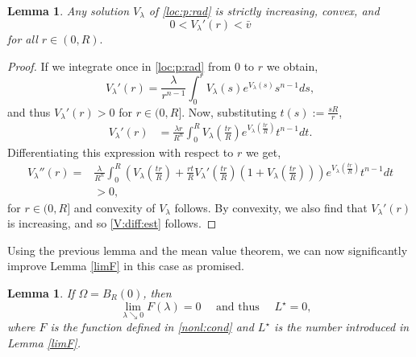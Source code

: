 \documentclass[12pt,a4paper]{amsart}
\newtheorem{lemma}[theorem]{Lemma}
\theoremstyle{definition}
\theoremstyle{remark}
\numberwithin{equation}{section}
\numberwithin{theorem}{section}
\begin{document}
\begin{lemma}
Any solution $V_\lambda$ of \eqref{loc:p:rad} is strictly increasing, convex, and
\begin{equation}\label{V:diff:est}
0<V_\lambda'(r)< \bar{v}
\end{equation}
for all $r\in(0,R).$
\end{lemma}

\begin{proof}
If we integrate once in \eqref{loc:p:rad} from $0$ to $r$ we obtain,
$$
V_\lambda'(r)=\frac{\lambda}{r^{n-1}}\int_0^rV_\lambda(s)e^{V_\lambda(s)}s^{n-1}ds,
$$
and thus $V_\lambda'(r)> 0$ for $r\in(0,R]$. Now,  substituting $t(s):=\frac{sR}{r}$,
\begin{align*}
V_\lambda'(r)
&=\frac{\lambda r}{R^n}
\int_0^R V_\lambda \left(\frac{tr}{R}\right) e^{V_\lambda(\frac{tr}{R})} t^{n-1}dt.
\end{align*}
Differentiating this expression with respect to $r$ we get,
\begin{align*}
V_\lambda''(r)=&
\frac{\lambda}{R^n}\int_0^R \left(V_\lambda \left(\frac{tr}{R}\right) +\frac{rt}{R} V_\lambda '\left(\frac{tr}{R}\right)\left(1+V_\lambda \left(\frac{tr}{R}\right)\right)\right) e^{V_\lambda(\frac{tr}{R})} t^{n-1}dt\\
&>0,
\end{align*}
for $r\in(0,R]$ and convexity of $V_\lambda$ follows. By convexity, we also find that $V_\lambda'(r)$ is increasing, and so \eqref{V:diff:est} follows. 

\end{proof}
Using the previous lemma and the mean value theorem, we can now significantly improve Lemma \ref{limF} in this case as promised.
\begin{lemma}\label{V:ball:lim}
If $\Omega=B_R(0)$, then
$$
\quad \lim_{\lambda \searrow 0} F(\lambda) = 0 \quad\text{ and thus }\quad L^\star = 0, 
$$
where $F$ is the function defined in \eqref{nonl:cond} and $L^\star$ is the number introduced in Lemma \ref{limF}.
\end{lemma}
\end{document}
